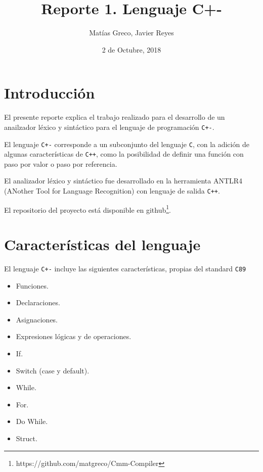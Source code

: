 \documentclass[12pt]{article}
\newcommand{\Cp}{\texttt{C+-}}
\newcommand{\C}{\texttt{C}}
\newcommand{\Cpp}{\texttt{C++}}
\begin{document}

\title{Reporte 1. Lenguaje C+-}
\author{Mat\'ias Greco, Javier Reyes}
\date{2 de Octubre, 2018}
\maketitle

\section*{Introducci\'on}
El presente reporte explica el trabajo realizado para el desarrollo de un anailzador l\'exico y sint\'actico para el lenguaje de programaci\'on \Cp.

El lenguaje \texttt{C+-} corresponde a un subconjunto del lenguaje \C, con la adici\'on de algunas caracter\'isticas de \Cpp, como la posibilidad de definir una funci\'on con paso por valor o paso por referencia.

El analizador l\'exico y sint\'actico fue desarrollado en la herramienta ANTLR4 (ANother Tool for Language Recognition) con lenguaje de salida \Cpp.

El repositorio del proyecto está disponible en github\footnote{https://github.com/matgreco/Cmm-Compiler}.


\section*{Caracter\'isticas del lenguaje}

El lenguaje \texttt{C+-} incluye las siguientes caracter\'isticas, propias del standard \texttt{C89}
\begin{itemize}
    \item Funciones.
    \item Declaraciones.
    \item Asignaciones.
    \item Expresiones l\'ogicas y de operaciones.
    \item If.
    \item Switch (case y default).
    \item While.
    \item For.
    \item Do While.
    \item Struct.
\end{itemize}
\end{document}
